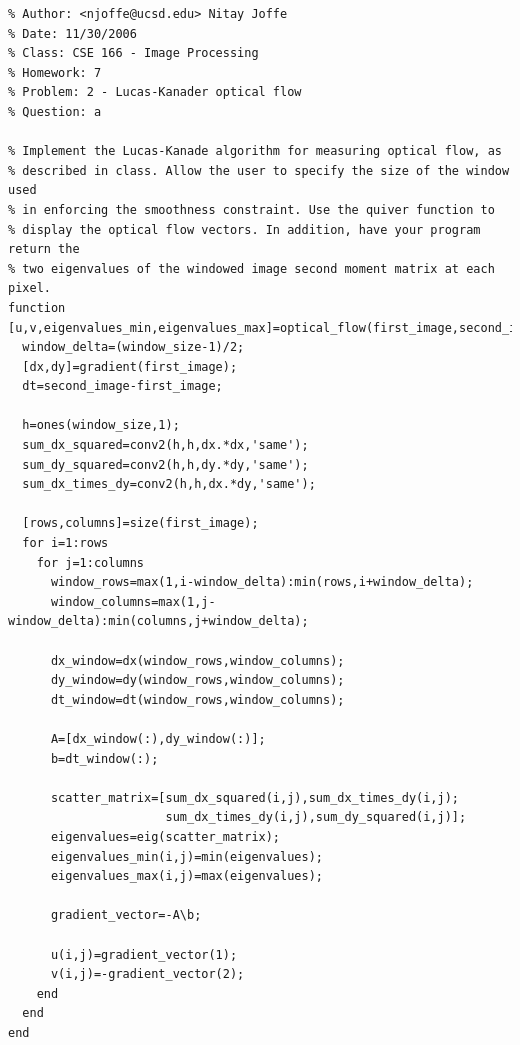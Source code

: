 \documentclass{article}
\begin{document}
\begin{verbatim}
% Author: <njoffe@ucsd.edu> Nitay Joffe
% Date: 11/30/2006
% Class: CSE 166 - Image Processing
% Homework: 7
% Problem: 2 - Lucas-Kanader optical flow
% Question: a

% Implement the Lucas-Kanade algorithm for measuring optical flow, as
% described in class. Allow the user to specify the size of the window used
% in enforcing the smoothness constraint. Use the quiver function to
% display the optical flow vectors. In addition, have your program return the
% two eigenvalues of the windowed image second moment matrix at each pixel.
function [u,v,eigenvalues_min,eigenvalues_max]=optical_flow(first_image,second_image,window_size)
  window_delta=(window_size-1)/2;
  [dx,dy]=gradient(first_image);
  dt=second_image-first_image;

  h=ones(window_size,1);
  sum_dx_squared=conv2(h,h,dx.*dx,'same');
  sum_dy_squared=conv2(h,h,dy.*dy,'same');
  sum_dx_times_dy=conv2(h,h,dx.*dy,'same');

  [rows,columns]=size(first_image);
  for i=1:rows
    for j=1:columns
      window_rows=max(1,i-window_delta):min(rows,i+window_delta);
      window_columns=max(1,j-window_delta):min(columns,j+window_delta);

      dx_window=dx(window_rows,window_columns);
      dy_window=dy(window_rows,window_columns);
      dt_window=dt(window_rows,window_columns);

      A=[dx_window(:),dy_window(:)];
      b=dt_window(:);

      scatter_matrix=[sum_dx_squared(i,j),sum_dx_times_dy(i,j);
                      sum_dx_times_dy(i,j),sum_dy_squared(i,j)];
      eigenvalues=eig(scatter_matrix);
      eigenvalues_min(i,j)=min(eigenvalues);
      eigenvalues_max(i,j)=max(eigenvalues);

      gradient_vector=-A\b;
      
      u(i,j)=gradient_vector(1);
      v(i,j)=-gradient_vector(2);      
    end
  end
end
\end{verbatim}
\newpage
\end{document}
